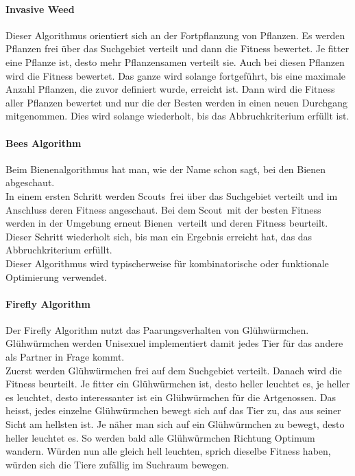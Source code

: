 		\paragraph{Invasive Weed}
		$\;$ \\
		Dieser Algorithmus orientiert sich an der Fortpflanzung von Pflanzen. Es werden Pflanzen frei über das Suchgebiet verteilt und dann die Fitness bewertet. Je fitter eine Pflanze ist, desto mehr Pflanzensamen verteilt sie. Auch bei diesen Pflanzen wird die Fitness bewertet. Das ganze wird solange fortgeführt, bis eine maximale Anzahl Pflanzen, die zuvor definiert wurde, erreicht ist. Dann wird die Fitness aller Pflanzen bewertet und nur die der Besten werden in einen neuen Durchgang mitgenommen. Dies wird solange wiederholt, bis das Abbruchkriterium erfüllt ist.
				
		
		\paragraph{Bees Algorithm}
		$\;$ \\
		Beim Bienenalgorithmus hat man, wie der Name schon sagt, bei den Bienen abgeschaut.\\
		In einem ersten Schritt werden \textacutedbl Scouts\textacutedbl \ frei über das Suchgebiet verteilt und im Anschluss deren Fitness angeschaut. Bei dem \textacutedbl Scout\textacutedbl \ mit der besten Fitness werden in der Umgebung erneut \textacutedbl Bienen\textacutedbl \ verteilt und deren Fitness beurteilt. Dieser Schritt wiederholt sich, bis man ein Ergebnis erreicht hat, das das Abbruchkriterium erfüllt.\\Dieser Algorithmus wird typischerweise für kombinatorische oder funktionale Optimierung verwendet.
		
		\paragraph{Firefly Algorithm} 
		$\;$ \\
		Der Firefly Algorithm nutzt das Paarungsverhalten von Glühwürmchen. Glühwürmchen werden Unisexuel implementiert damit jedes Tier für das andere als Partner in Frage kommt. \\
		Zuerst werden Glühwürmchen frei auf dem Suchgebiet verteilt. Danach wird die Fitness beurteilt. Je fitter ein Glühwürmchen ist, desto heller leuchtet es, je heller es leuchtet, desto interessanter ist ein Glühwürmchen für die Artgenossen. Das heisst, jedes einzelne Glühwürmchen bewegt sich auf das Tier zu, das aus seiner Sicht am hellsten ist. Je näher man sich auf ein Glühwürmchen zu bewegt, desto heller leuchtet es. So werden bald alle Glühwürmchen Richtung Optimum wandern. Würden nun alle gleich hell leuchten, sprich dieselbe Fitness haben, würden sich die Tiere zufällig im Suchraum bewegen.
		